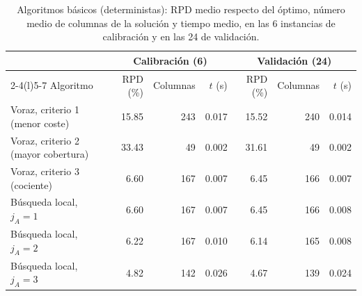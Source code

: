 \begin{table}[H]
\centering
\caption{Algoritmos básicos (deterministas): RPD medio respecto del óptimo, número medio de columnas de la solución y tiempo medio, en las 6 instancias de calibración y en las 24 de validación.}
\label{tab:basicos}
\small\setlength{\tabcolsep}{4.5pt}
\begin{tabular}{@{}lrrrrrr@{}}
\toprule
 & \multicolumn{3}{c}{Calibración (6)} & \multicolumn{3}{c}{Validación (24)} \\
\cmidrule(lr){2-4}\cmidrule(l){5-7}
Algoritmo & RPD (\%) & Columnas & $t$ (s) & RPD (\%) & Columnas & $t$ (s) \\ \midrule
Voraz, criterio 1 (menor coste) & 15.85 & 243 & 0.017 & 15.52 & 240 & 0.014 \\
Voraz, criterio 2 (mayor cobertura) & 33.43 & 49 & 0.002 & 31.61 & 49 & 0.002 \\
Voraz, criterio 3 (cociente) & 6.60 & 167 & 0.007 & 6.45 & 166 & 0.007 \\
\midrule
Búsqueda local, $j_A=1$ & 6.60 & 167 & 0.007 & 6.45 & 166 & 0.008 \\
Búsqueda local, $j_A=2$ & 6.22 & 167 & 0.010 & 6.14 & 165 & 0.008 \\
Búsqueda local, $j_A=3$ & 4.82 & 142 & 0.026 & 4.67 & 139 & 0.024 \\
\bottomrule
\end{tabular}
\end{table}
